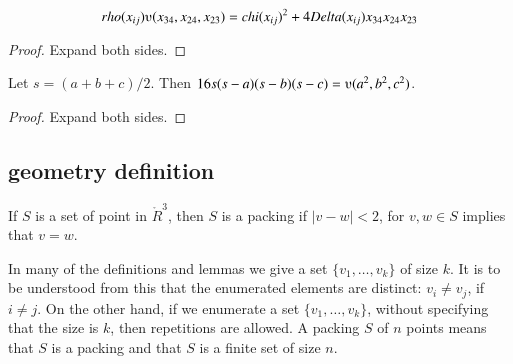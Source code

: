 \begin{tarskidata}
\begin{tarski}
\begin{lemma}
  $$\rho(x_{ij}) \ups(x_{34},x_{24},x_{23}) = \chi(x_{ij})^2 +
  4 \Delta(x_{ij}) x_{34} x_{24} x_{23}$$
\end{lemma}

\begin{proof} Expand both sides.
\end{proof}
\end{tarski}



\begin{tarski}

\begin{lemma}
Let $s = (a+b+c)/2$.  Then $16 s(s-a)(s-b)(s-c) = \ups(a^2,b^2,c^2)$.
\end{lemma}

\begin{proof} Expand both sides. 
\end{proof}
\end{tarski}









\begin{tarski}
\section{geometry definition}  

\begin{definition}[packing]
If $S$ is a set of point in $\ring{R}^3$, then
$S$ is a packing if $|v-w| < 2$, for $v,w\in S$ implies that $v=w$.
\end{definition}
In many of the definitions and lemmas we give a set $\{v_1,\ldots,v_k\}$
of size $k$.  It is to be understood from this  
that the enumerated elements are distinct: $v_i\ne v_j$, if $i\ne j$.
On the other hand, if we enumerate a set $\{v_1,\ldots,v_k\}$, without
specifying that the size is $k$, then repetitions are allowed.
A packing $S$ of $n$ points means that $S$ is a packing and that $S$
is a finite set of size $n$.
\end{tarski}




\end{tarskidata}
